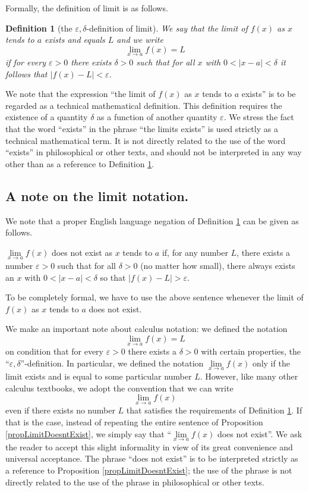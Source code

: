 \documentclass[12pt]{book}
\newtheorem{definition}[theorem]{Definition}
\begin{document}
Formally, the definition of limit is as follows.
\begin{definition}[the $\varepsilon, \delta$-definition of limit] \label{defLimit}
We say that the limit of $f(x)$ as $x$ tends to $a$ exists and equals $L$ and we write
\[
\lim_{x\to a} f(x)=L
\]
if for every $\varepsilon>0$ there exists $\delta>0$ such that for all $x$ with $0<|x-a|<\delta$ it follows that  $|f(x)-L|<\varepsilon$.
\end{definition}
We note that the expression ``the limit of $f(x)$ as $x$ tends to $a$ exists'' is to be regarded as a technical mathematical definition. This definition requires the existence of a quantity $\delta$ as a function of another quantity $\varepsilon $. We stress the fact that the word ``exists'' in the phrase ``the limits exists'' is used strictly as a technical mathematical term. It is not directly related to the use of the word ``exists'' in philosophical or other texts, and should not be interpreted in any way other than as a reference to Definition \ref{defLimit}.
\subsection{A note on the limit notation.}
We note that a proper English language negation of Definition \ref{defLimit} can be given as follows.
\begin{proposition}\label{propLimitDoesntExist}
$\lim\limits_{x\to a}f(x) $ does not exist as $x$ tends to $a$ if, for any number $L$, there exists a number $\varepsilon>0$ such that for all $\delta>0$ (no matter how small), there always exists an $x$ with $0<|x-a|<\delta$ so that $|f(x)-L|>\varepsilon$.
\end{proposition}
To be completely formal, we have to use the above sentence whenever the limit of $f(x)$ as $x$ tends to $a$ does not exist.


We make an important note about calculus notation: we defined the notation
\[
\lim\limits_{x\to a} f(x)=L
\]
on condition that for every $\varepsilon>0$ there exists a $\delta>0$ with certain properties,  the ``$\varepsilon, \delta$''-definition. In particular, we defined the notation $\lim\limits_{x\to a}f(x)$ only if the limit exists and is equal to some particular number $L$. However, like many other calculus textbooks, we adopt the convention that we can write
\[
\lim\limits_{x\to a}f(x)
\]
even if there exists no number $L$ that satisfies the requirements of Definition \ref{defLimit}. If that is the case, instead of repeating the entire sentence of Proposition \ref{propLimitDoesntExist}, we simply say that ``$\lim\limits_{x\to a}f(x)$ does not exist''. We ask the reader to accept this slight informality in view of its great convenience and universal acceptance. The phrase ``does not exist'' is to be interpreted strictly as a reference to Proposition \ref{propLimitDoesntExist}; the use of the phrase is not directly related to the use of the phrase in philosophical or other texts.
\end{document}
